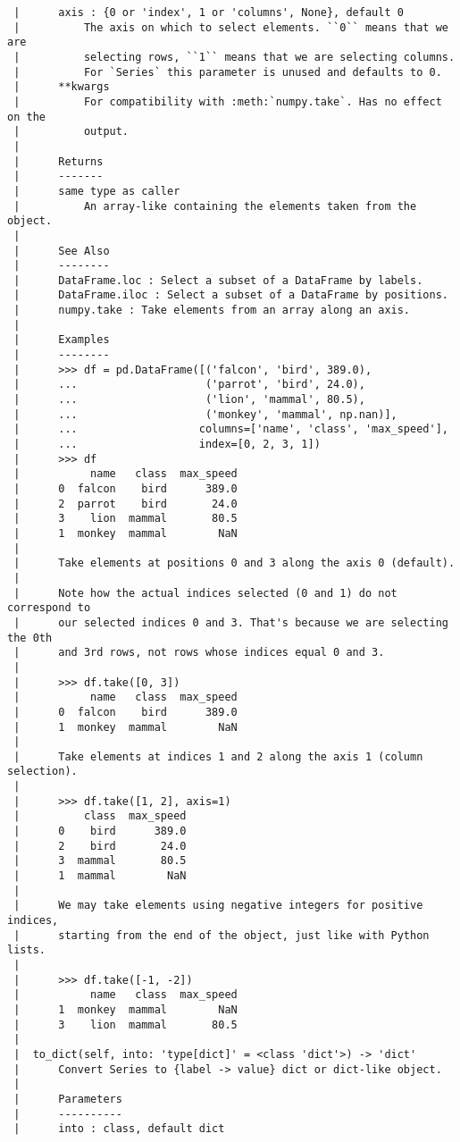 \documentclass[
  letterpaper,
  DIV=11,
  numbers=noendperiod]{scrreprt}
\begin{document}
\begin{verbatim}
 |      axis : {0 or 'index', 1 or 'columns', None}, default 0
 |          The axis on which to select elements. ``0`` means that we are
 |          selecting rows, ``1`` means that we are selecting columns.
 |          For `Series` this parameter is unused and defaults to 0.
 |      **kwargs
 |          For compatibility with :meth:`numpy.take`. Has no effect on the
 |          output.
 |      
 |      Returns
 |      -------
 |      same type as caller
 |          An array-like containing the elements taken from the object.
 |      
 |      See Also
 |      --------
 |      DataFrame.loc : Select a subset of a DataFrame by labels.
 |      DataFrame.iloc : Select a subset of a DataFrame by positions.
 |      numpy.take : Take elements from an array along an axis.
 |      
 |      Examples
 |      --------
 |      >>> df = pd.DataFrame([('falcon', 'bird', 389.0),
 |      ...                    ('parrot', 'bird', 24.0),
 |      ...                    ('lion', 'mammal', 80.5),
 |      ...                    ('monkey', 'mammal', np.nan)],
 |      ...                   columns=['name', 'class', 'max_speed'],
 |      ...                   index=[0, 2, 3, 1])
 |      >>> df
 |           name   class  max_speed
 |      0  falcon    bird      389.0
 |      2  parrot    bird       24.0
 |      3    lion  mammal       80.5
 |      1  monkey  mammal        NaN
 |      
 |      Take elements at positions 0 and 3 along the axis 0 (default).
 |      
 |      Note how the actual indices selected (0 and 1) do not correspond to
 |      our selected indices 0 and 3. That's because we are selecting the 0th
 |      and 3rd rows, not rows whose indices equal 0 and 3.
 |      
 |      >>> df.take([0, 3])
 |           name   class  max_speed
 |      0  falcon    bird      389.0
 |      1  monkey  mammal        NaN
 |      
 |      Take elements at indices 1 and 2 along the axis 1 (column selection).
 |      
 |      >>> df.take([1, 2], axis=1)
 |          class  max_speed
 |      0    bird      389.0
 |      2    bird       24.0
 |      3  mammal       80.5
 |      1  mammal        NaN
 |      
 |      We may take elements using negative integers for positive indices,
 |      starting from the end of the object, just like with Python lists.
 |      
 |      >>> df.take([-1, -2])
 |           name   class  max_speed
 |      1  monkey  mammal        NaN
 |      3    lion  mammal       80.5
 |  
 |  to_dict(self, into: 'type[dict]' = <class 'dict'>) -> 'dict'
 |      Convert Series to {label -> value} dict or dict-like object.
 |      
 |      Parameters
 |      ----------
 |      into : class, default dict

\end{verbatim}
\end{document}
